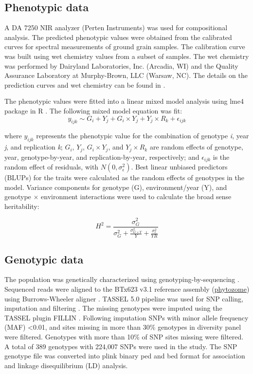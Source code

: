 \documentclass[10pt,letterpaper]{article}
\begin{document}
\subsection*{Phenotypic data}
A DA 7250\texttrademark{} NIR analyzer (Perten Instruments) was used for compositional analysis. The predicted phenotypic values were obtained from the calibrated curves for spectral measurements of ground grain samples. The calibration curve was built using wet chemistry values from a subset of samples. The wet chemistry was performed by Dairyland Laboratories, Inc. (Arcadia, WI) and the Quality Assurance Laboratory at Murphy-Brown, LLC (Warsaw, NC). The details on the prediction curves and wet chemistry can be found in \citet{boyles2017genetic}.

The phenotypic values were fitted into a linear mixed model analysis using lme4 package in R \parencite{lme42015,Rcore2019}. The following mixed model equation was fit:
\begin{equation}
y_{ijk} \sim G_i + Y_j  +  G_i \times Y_j + Y_j \times R_k + \epsilon_{ijk}
\label{eqn:GSDP}
\end{equation}

where $y_{ijk}$ represents the phenotypic value for the combination of genotype \textit{i}, year \textit{j}, and replication \textit{k}; $G_i$, $Y_j$, $G_i \times Y_j$, and $Y_j \times R_k$ are random effects of genotype, year, genotype-by-year, and replication-by-year, respectively; and $\epsilon_{ijk}$ is the random effect of residuals, with $N(0, \sigma_{\epsilon}^2)$. Best linear unbiased predictors (BLUPs) for the traits were calculated as the random effects of genotypes in the model. Variance components for genotype (G), environment/year (Y), and genotype $\times$ environment interactions were used to calculate the broad sense heritability:

\begin{equation}
    H^2 = \frac{\sigma^2_G}{\sigma^2_G + \frac{\sigma^2_{G \times Y}}{Y} + \frac{\sigma^2_{\epsilon}}{YR}}
\end{equation}

\subsection*{Genotypic data}
The population was genetically characterized using genotyping-by-sequencing \parencite{morris2013population,boyles2016genome}. Sequenced reads were aligned to the BTx623 v3.1 reference assembly (\href{www.phytozome.net}{phytozome}) using Burrows-Wheeler aligner \parencite{li2010fast}. TASSEL 5.0 pipeline was used for SNP calling, imputation and filtering \parencite{glaubitz2014tassel}. The missing genotypes were imputed using the TASSEL plugin FILLIN \parencite{swarts2014novel}. Following imputation SNPs with minor allele frequency (MAF) \textless 0.01, and sites missing in more than 30\% genotypes in diversity panel were filtered. Genotypes with more than 10\% of SNP sites missing were filtered. A total of 389 genotypes with 224,007 SNPs were used in the study. The SNP genotype file was converted into plink \parencite{purcell2007plink} binary ped and bed format for association and linkage disequilibrium (LD) analysis.
\end{document}
